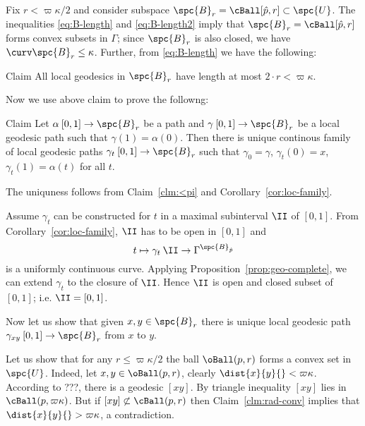 Fix $r<\varpi\kappa/2$ and consider subspace $\spc{B}_r=\cBall[\hat p,r]\subset\spc{U}$.
The inequalities \ref{eq:B-length}  and \ref{eq:B-length2} imply that  $\spc{B}_r=\cBall[\hat p,r]$ forms convex subsets in $\Gamma$;
since $\spc{B}_r$ is also closed, we have $\curv\spc{B}_r\le\kappa$.
Further, from \ref{eq:B-length} we have the following:

\begin{clm}{Claim}\label{clm:<pi}
All local geodesics in $\spc{B}_r$ 
have length at most $2\cdot r<\varpi\kappa$.
\end{clm}

Now we use above claim to prove the followng:
 
\begin{clm}{Claim}\label{clm:homotopy}
Let  $\alpha\:[0,1]\to \spc{B}_r$ be a path
and $\gamma\:[0,1]\to \spc{B}_r$ be a local geodesic path 
such that $\gamma(1)=\alpha(0)$.
Then there is unique continous family of local geodesic paths $\gamma_t\:[0,1]\to \spc{B}_r$
such that $\gamma_0=\gamma$, $\gamma_t(0)=x$, $\gamma_t(1)=\alpha(t)$ for all $t$.
\end{clm}

The uniquness follows from  Claim~\ref{clm:<pi} and Corollary~\ref{cor:loc-family}.

Assume $\gamma_t$ can be constructed for $t$ in a maximal subinterval $\II$ of $[0,1]$.
From Corollary~\ref{cor:loc-family}, $\II$ has to be open in $[0,1]$
and 
$$t\mapsto\gamma_t\:\II\to\Gamma^{\spc{B}_{\hat p}}$$ 
is a uniformly continuous curve.
Applying  Proposition~\ref{prop:geo-complete}, we can extend $\gamma_t$ to the closure of $\II$.
Hence $\II$ is open and closed subset of $[0,1]$;
i.e. $\II=[0,1]$.
\qeds

Now let us show that given $x,y\in \spc{B}_r$ there is unique local geodesic path $\gamma_{xy}\:[0,1]\to \spc{B}_r$ from $x$ to $y$.









Let us show that for any $ r\le\varpi\kappa/2$ the ball $\oBall(p, r)$ forms a convex set in $\spc{U}$.
Indeed, let $x,y\in\oBall(p, r)$, clearly $\dist{x}{y}{}<\varpi\kappa$.
According to ???, there is a geodesic $[xy]$.
By triangle inequality $[xy]$ lies in $\cBall(p,\varpi\kappa)$.
But if $[xy]\not\subset\cBall(p, r)$ then Claim~\ref{clm:rad-conv} implies that $\dist{x}{y}{}>\varpi\kappa$, a contradiction.

